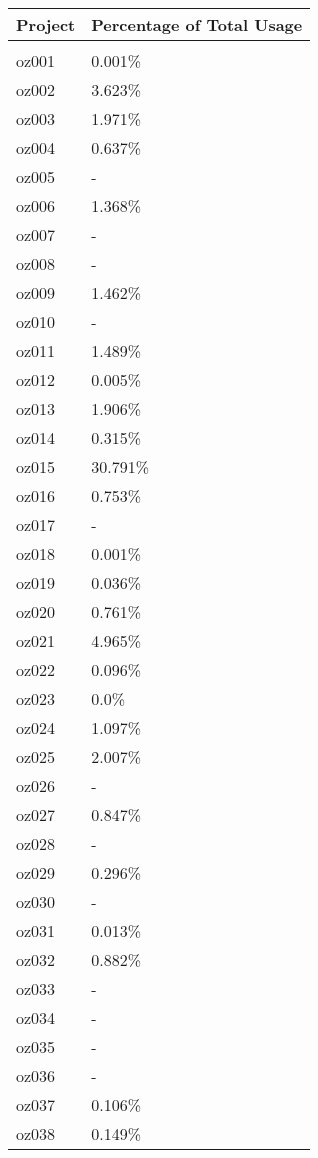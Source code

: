 \documentclass{article}%
\begin{document}
%
\begin{longtabu}{X[l] X[r]}%
\textbf{Project}&\textbf{Percentage of Total Usage}\\%
\hline%
&\\%
oz001&0.001\%\\%
\hline%
oz002&3.623\%\\%
\hline%
oz003&1.971\%\\%
\hline%
oz004&0.637\%\\%
\hline%
oz005&{-}\\%
\hline%
oz006&1.368\%\\%
\hline%
oz007&{-}\\%
\hline%
oz008&{-}\\%
\hline%
oz009&1.462\%\\%
\hline%
oz010&{-}\\%
\hline%
oz011&1.489\%\\%
\hline%
oz012&0.005\%\\%
\hline%
oz013&1.906\%\\%
\hline%
oz014&0.315\%\\%
\hline%
oz015&30.791\%\\%
\hline%
oz016&0.753\%\\%
\hline%
oz017&{-}\\%
\hline%
oz018&0.001\%\\%
\hline%
oz019&0.036\%\\%
\hline%
oz020&0.761\%\\%
\hline%
oz021&4.965\%\\%
\hline%
oz022&0.096\%\\%
\hline%
oz023&0.0\%\\%
\hline%
oz024&1.097\%\\%
\hline%
oz025&2.007\%\\%
\hline%
oz026&{-}\\%
\hline%
oz027&0.847\%\\%
\hline%
oz028&{-}\\%
\hline%
oz029&0.296\%\\%
\hline%
oz030&{-}\\%
\hline%
oz031&0.013\%\\%
\hline%
oz032&0.882\%\\%
\hline%
oz033&{-}\\%
\hline%
oz034&{-}\\%
\hline%
oz035&{-}\\%
\hline%
oz036&{-}\\%
\hline%
oz037&0.106\%\\%
\hline%
oz038&0.149\%\\%

\end{longtabu}
\end{document}
